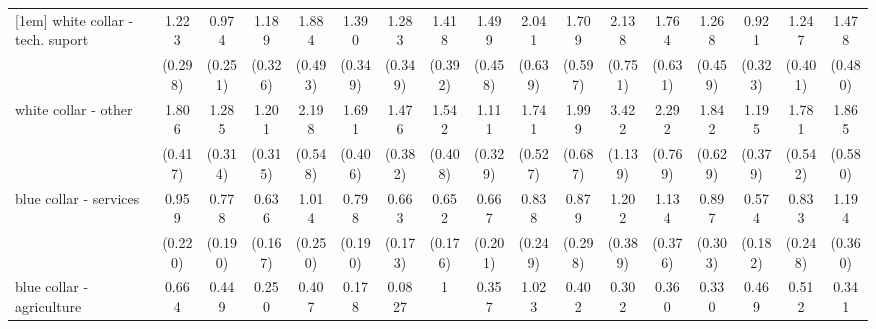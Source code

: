 {\begin{tabular}{l*{16}{c}}
[1em]
white collar - tech. suport&       1.223         &       0.974         &       1.189         &       1.884\sym{*}  &       1.390         &       1.283         &       1.418         &       1.499         &       2.041\sym{*}  &       1.709         &       2.138\sym{*}  &       1.764         &       1.268         &       0.921         &       1.247         &       1.478         \\
                    &     (0.298)         &     (0.251)         &     (0.326)         &     (0.493)         &     (0.349)         &     (0.349)         &     (0.392)         &     (0.458)         &     (0.639)         &     (0.597)         &     (0.751)         &     (0.631)         &     (0.459)         &     (0.323)         &     (0.401)         &     (0.480)         \\
[1em]
white collar - other&       1.806\sym{*}  &       1.285         &       1.201         &       2.198\sym{**} &       1.691\sym{*}  &       1.476         &       1.542         &       1.111         &       1.741         &       1.999\sym{*}  &       3.422\sym{***}&       2.292\sym{*}  &       1.842         &       1.195         &       1.781         &       1.865\sym{*}  \\
                    &     (0.417)         &     (0.314)         &     (0.315)         &     (0.548)         &     (0.406)         &     (0.382)         &     (0.408)         &     (0.329)         &     (0.527)         &     (0.687)         &     (1.139)         &     (0.769)         &     (0.629)         &     (0.379)         &     (0.542)         &     (0.580)         \\
[1em]
blue collar - services&       0.959         &       0.778         &       0.636         &       1.014         &       0.798         &       0.663         &       0.652         &       0.667         &       0.838         &       0.879         &       1.202         &       1.134         &       0.897         &       0.574         &       0.833         &       1.194         \\
                    &     (0.220)         &     (0.190)         &     (0.167)         &     (0.250)         &     (0.190)         &     (0.173)         &     (0.176)         &     (0.201)         &     (0.249)         &     (0.298)         &     (0.389)         &     (0.376)         &     (0.303)         &     (0.182)         &     (0.248)         &     (0.360)         \\
[1em]
blue collar - agriculture&       0.664         &       0.449         &       0.250\sym{*}  &       0.407         &       0.178\sym{*}  &      0.0827\sym{*}  &           1         &       0.357         &       1.023         &       0.402         &       0.302         &       0.360         &       0.330         &       0.469         &       0.512         &       0.341         \\

\end{tabular}}

